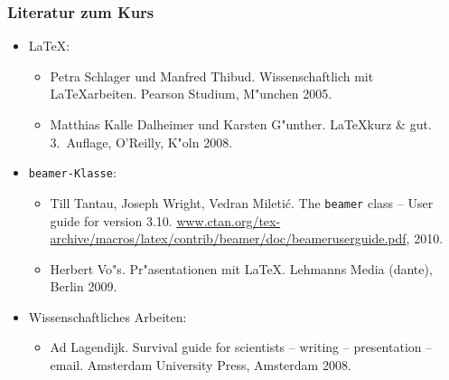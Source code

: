 \begin{frame}[t,label=mab_refs] \frametitle{Literatur zum Kurs}
  \begin{itemize}
    \item \textsf{\LaTeX{}}:
      \begin{itemize}
        \item\label{it:SchlagerThibud} 
              Petra Schlager und Manfred Thibud.
              Wissenschaftlich mit \LaTeX arbeiten.
              Pearson Studium, M"unchen 2005.
        \item\label{it:DalheimerGuenther}
              Matthias Kalle Dalheimer und Karsten G"unther.
              \LaTeX kurz \& gut.
              3.~Auflage, O'Reilly, K"oln 2008.
      \end{itemize}
    \item \texttt{beamer}\texttt{-Klasse}:
      \begin{itemize}
        \item\label{TantauWrightMiletic}
              Till Tantau, Joseph Wright, Vedran Mileti{\'c}.
              The \texttt{beamer} class -- User guide for version 3.10.
              \href{http://www.ctan.org/tex-archive/macros/latex/contrib/beamer/doc/beameruserguide.pdf}{\url{www.ctan.org/tex-archive/macros/latex/contrib/beamer/doc/beameruserguide.pdf}}, 2010.
        \item\label{it:Voss}
              Herbert Vo"s.
              Pr"asentationen mit \LaTeX.
              Lehmanns Media (dante), Berlin 2009.
      \end{itemize}
    \item \textsf{Wissenschaftliches Arbeiten}:
      \begin{itemize}
        \item\label{it:Lagendijk}
              Ad Lagendijk.
              Survival guide for scientists -- writing -- presentation -- email.
              Amsterdam University Press, Amsterdam 2008.
      \end{itemize}
  \end{itemize}
\end{frame}

